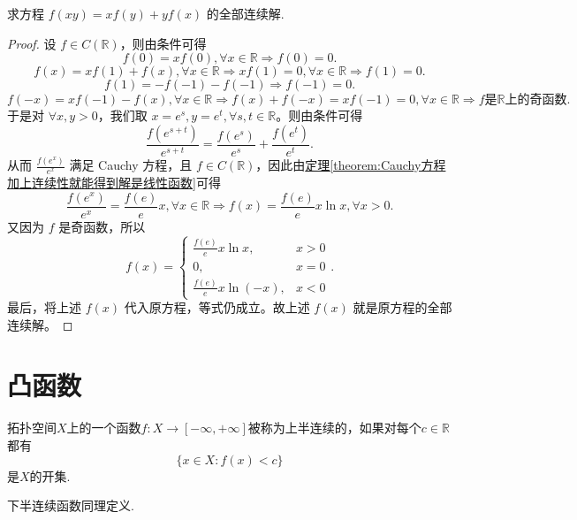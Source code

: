 \documentclass[lang=cn,newtx,10pt,scheme=chinese]{elegantbook}
\begin{document}
\begin{example}
求方程 \(f(xy)=xf(y)+yf(x)\) 的全部连续解.
\end{example}
\begin{proof}
设 \(f\in C(\mathbb{R})\)，则由条件可得
\[
f(0)=xf(0),\forall x\in \mathbb{R}\Rightarrow f(0)=0.
\]
\[
f(x)=xf(1)+f(x),\forall x\in \mathbb{R}\Rightarrow xf(1)=0,\forall x\in \mathbb{R}\Rightarrow f(1)=0.
\]
\[
f(1)=-f(-1)-f(-1)\Rightarrow f(-1)=0.
\]
\[
f(-x)=xf(-1)-f(x),\forall x\in \mathbb{R}\Rightarrow f(x)+f(-x)=xf(-1)=0,\forall x\in \mathbb{R}
\Rightarrow f\text{是}\mathbb{R}\text{上的奇函数}.
\]
于是对 \(\forall x,y > 0\)，我们取 \(x = e^s,y = e^t,\forall s,t\in \mathbb{R}\)。则由条件可得
\[
\frac{f(e^{s + t})}{e^{s + t}}=\frac{f(e^s)}{e^s}+\frac{f(e^t)}{e^t}.
\]
从而 \(\frac{f(e^x)}{e^x}\) 满足 Cauchy 方程，且 \(f\in C(\mathbb{R})\)，因此由\hyperref[theorem:Cauchy方程加上连续性就能得到解是线性函数]{定理\ref{theorem:Cauchy方程加上连续性就能得到解是线性函数}}可得
\[
\frac{f(e^x)}{e^x}=\frac{f(e)}{e}x,\forall x\in \mathbb{R}\Rightarrow f(x)=\frac{f(e)}{e}x\ln x,\forall x > 0.
\]
又因为 \(f\) 是奇函数，所以
\[
f(x)=\begin{cases}
\frac{f(e)}{e}x\ln x, & x > 0\\
0, & x = 0\\
\frac{f(e)}{e}x\ln(-x), & x < 0
\end{cases}.
\]
最后，将上述 \(f(x)\) 代入原方程，等式仍成立。故上述 \(f(x)\) 就是原方程的全部连续解。
\end{proof}









\section{凸函数}

\begin{definition}[半连续函数定义]\label{definition:半连续函数定义}
拓扑空间\(X\)上的一个函数\(f:X\to[-\infty,+\infty]\)被称为上半连续的，如果对每个\(c\in\mathbb{R}\)都有
\[\{x\in X:f(x)<c\}\]
是\(X\)的开集.
\end{definition}
\begin{note}
下半连续函数同理定义.
\end{note}
\end{document}
